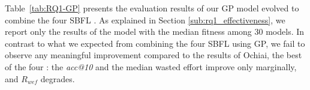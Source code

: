 
Table~\ref{tab:RQ1-GP} presents the evaluation results of our GP model evolved to combine the four SBFL \formulas.
As explained in Section \ref{sub:rq1_effectiveness}, we report only the results of the model with the median fitness among 30 models. 
In contrast to what we expected from combining the four SBFL \formulas using GP, we fail to observe any meaningful improvement compared to the results of Ochiai, the best of the four \formulas: 
the \textit{acc@10} and the median wasted effort improve only marginally, and $R_{wef}$ degrades. 


\begin{table}[t!]
\caption{RQ1: The effectiveness of GP evolved \formulas using Ochiai, Barinel, Tarantula, and DStar. \label{tab:RQ1-GP}\centering}
\vspace{-0.5em}
\centering
{}
\vspace{-2.2em}
\end{table}

